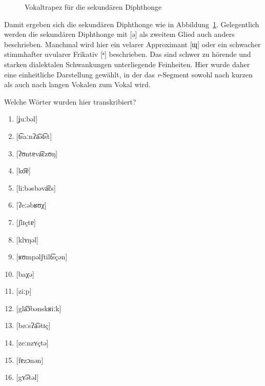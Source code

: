 \begin{figure}[!htpb]
  \caption{Vokaltrapez für die sekundären Diphthonge}
  \label{fig:orthographischesr031}
\end{figure}

Damit ergeben sich die sekundären Diphthonge wie in Abbildung~\ref{fig:orthographischesr031}.
Gelegentlich werden die sekundären Diphthonge mit [ə] als zweitem Glied auch anders beschrieben.
Manchmal wird hier ein velarer Approximant [ɰ] oder ein schwacher stimmhafter uvularer Frikativ [ʶ] beschrieben.
Das sind schwer zu hörende und starken dialektalen Schwankungen unterliegende Feinheiten.
Hier wurde daher eine einheitliche Darstellung gewählt, in der das \textit{r}-Segment sowohl nach kurzen als auch nach langen Vokalen zum Vokal wird.

\Stretch


\Uebungen

 \label{exc:phonetik01} Welche Wörter wurden hier transkribiert?

\begin{enumerate}
  \item{[ʝuːbəl]}
  \item{[t͡saːnʔa͡ət͡st]}
  \item{[ʔʊntɐva͡ɛzʊŋ]}
  \item{[ko͡ɐ]}
  \item{[liːbəsbəva͡ɛs]}
  \item{[ʔeːəbʁʊχ]}
  \item{[ʃlɪçtɐ]}
  \item{[klʏŋəl]}
  \item{[ʁʊmpəlʃtilt͡sçən]}
  \item{[baχə]}
  \item{[ziːp]}
  \item{[gla͡ɔbənskʁiːk]}
  \item{[bøːsʔa͡ətɪç]}
  \item{[zeːnzʏçtə]}
  \item{[fɐzɔnən]}
  \item{[gʏ͡ətəl]}
\end{enumerate}

